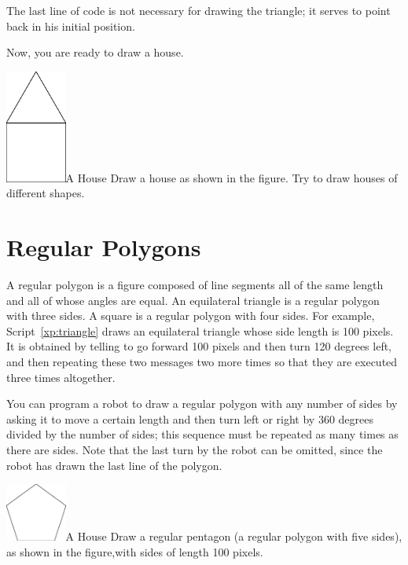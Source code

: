 \documentclass[a4paper,10pt,twoside]{book}
\begin{document}
The last line of code is not necessary for drawing the triangle; it serves to point  back in 
his initial position. 

Now, you are ready to draw a house. 

\begin{exofigwithsize}[0.5]{\includegraphics[width=2cm]{ChTurnbabyHouse}}{A House}\label{xp:house}
	Draw a house as shown in the figure. Try to draw houses of different shapes. 
\end{exofigwithsize}


\section{Regular Polygons}

A regular polygon is a figure composed of line segments all of the same length and all of 
whose angles are equal. An equilateral triangle is a regular polygon with three sides. A square 
is a regular polygon with four sides. For example, Script~\ref{xp:triangle} draws an equilateral triangle 
whose side length is 100 pixels. It is obtained by telling  to go forward 100 pixels and then 
turn 120 degrees left, and then repeating these two messages two more times so that they are 
executed three times altogether. 

You can program a robot to draw a regular polygon with any number of sides by asking it 
to move a certain length and then turn left or right by 360 degrees divided by the number of 
sides; this sequence must be repeated as many times as there are sides. Note that the last turn 
by the robot can be omitted, since the robot has drawn the last line of the polygon. 


\begin{exofigwithsize}[0.5]{\includegraphics[width=2cm]{ChTurnpentagon}}{A House}\label{xp:penta}
	Draw a regular pentagon (a regular polygon with five sides), as shown in the figure,with sides of length 100 pixels.
\end{exofigwithsize}
\end{document}
